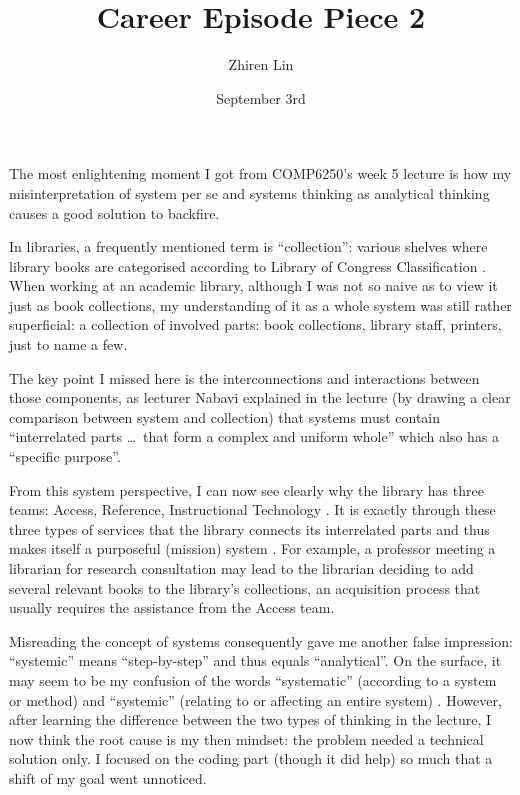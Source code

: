\documentclass{cep}
\begin{document}
\title{Career Episode Piece 2}
\author{Zhiren Lin}
\date{September 3rd}
\maketitle


The most enlightening moment I got from COMP6250’s week 5 lecture is how my misinterpretation of system per se and systems thinking as analytical thinking causes a good solution to backfire.

In libraries, a frequently mentioned term is “collection”: various shelves where library books are categorised according to Library of Congress Classification \parencites{site:loc}{wiki:loc}. When working at an academic library, although I was not so naive as to view it just as book collections, my understanding of it as a whole system was still rather superficial: a collection of involved parts: book collections, library staff, printers, just to name a few.

The key point I missed here is the interconnections and interactions between those components, as lecturer Nabavi  explained in the lecture (by drawing a clear comparison between system and collection) that systems must contain “interrelated parts \ldots\ that form a complex and uniform whole” which also has a “specific purpose”.

From this system perspective, I can now see clearly why the library has three teams: Access, Reference, Instructional Technology \parencite{site:nyuteams}. It is exactly through these three types of services that the library connects its interrelated parts and thus makes itself a purposeful (mission) system \parencite{site:nyulibmission}. For example, a professor meeting a librarian for research consultation may lead to the librarian deciding to add several relevant books to the library’s collections, an acquisition process that usually requires the assistance from the Access team.

Misreading the concept of systems consequently gave me another false impression: “systemic” means “step-by-step” and thus equals “analytical”.  On the surface, it may seem to be my confusion of the words “systematic” (according to a system or method) and “systemic” (relating to or affecting an entire system) \parencite{mw:systematic}. However, after learning the difference between the two types of thinking in the lecture, I now think the root cause is my then mindset: the problem needed a technical solution only. I focused on the coding part (though it did help) so much that a shift of my goal went unnoticed.
\end{document}
